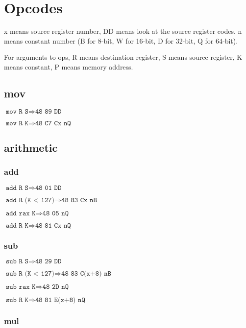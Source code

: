\documentclass{article}
\begin{document}
\section*{Opcodes}

x means source register number, DD means look at the source register codes. n
means constant number (B for 8-bit, W for 16-bit, D for 32-bit, Q for 64-bit).

For arguments to ops, R means destination register, S means source register, K
means constant, P means memory address.

\subsection*{mov}

$\texttt{mov R S} \Rightarrow \texttt{48 89 DD}$

$\texttt{mov R K} \Rightarrow \texttt{48 C7 Cx nQ}$


\subsection*{arithmetic}

\subsubsection*{add}

$\texttt{add R S} \Rightarrow \texttt{48 01 DD}$

$\texttt{add R (K < 127)} \Rightarrow \texttt{48 83 Cx nB}$

$\texttt{add rax K} \Rightarrow \texttt{48 05 nQ}$

$\texttt{add R K} \Rightarrow \texttt{48 81 Cx nQ}$


\subsubsection*{sub}

$\texttt{sub R S} \Rightarrow \texttt{48 29 DD}$

$\texttt{sub R (K < 127)} \Rightarrow \texttt{48 83 C(x+8) nB}$

$\texttt{sub rax K} \Rightarrow \texttt{48 2D nQ}$

$\texttt{sub R K} \Rightarrow \texttt{48 81 E(x+8) nQ}$


\subsubsection*{mul}
\end{document}
